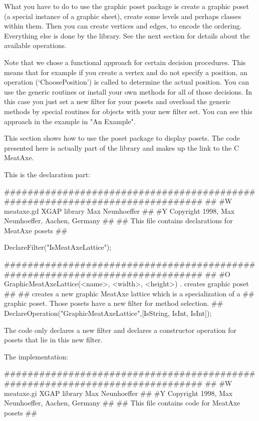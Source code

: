 What you have to do to use the graphic poset package is create a graphic
poset (a special instance of a graphic sheet), create some levels and
perhaps classes within them. Then you can create vertices and edges, to
encode the ordering. Everything else is done by the library. See the next
section for details about the available operations.

Note that we chose a functional approach for certain decision
procedures. This means that for example if you create a vertex and do not
specify a position, an operation (`ChoosePosition') is called to determine
the actual position. You can use the generic routines or install your own
methods for all of those decisions. In this case you just set a new filter
for your posets and overload the generic methods by special routines for
objects with your new filter set. You can see this approach in the example
in "An Example".




This section shows how to use the poset package to display posets. The code
presented here is actually part of the {\XGAP} library and makes up the
link to the C MeatAxe.

This is the declaration part:

\begintt
#############################################################################
##
#W  meataxe.gd                  XGAP library                  Max Neunhoeffer
##
#Y  Copyright 1998,       Max Neunhoeffer,              Aachen,       Germany
##
##  This file contains declarations for MeatAxe posets
##

DeclareFilter("IsMeatAxeLattice");

#############################################################################
##
#O  GraphicMeatAxeLattice(<name>, <width>, <height>)  . creates graphic poset
##
##  creates a new graphic MeatAxe lattice which is a specialization of a
##  graphic poset. Those posets have a new filter for method selection.
##
DeclareOperation("GraphicMeatAxeLattice",[IsString, IsInt, IsInt]);
\endtt

The code only declares a new filter and declares a constructor operation
for posets that lie in this new filter.

The implementation:

\begintt
#############################################################################
##
#W  meataxe.gi                  XGAP library                  Max Neunhoeffer
##
#Y  Copyright 1998,       Max Neunhoeffer,              Aachen,       Germany
##
##  This file contains code for MeatAxe posets
##

